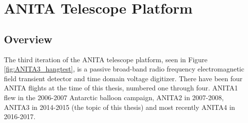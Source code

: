 
\chapter{ANITA Telescope Platform}
\section{Overview}
	The third iteration of the ANITA telescope platform, seen in Figure \ref{fig:ANITA3_hangtest}, is a passive broad-band radio frequency electromagnetic field transient detector and time domain voltage digitizer.  There have been four ANITA flights at the time of this thesis, numbered one through four.  ANITA1 flew in the 2006-2007 Antarctic balloon campaign\cite{ANITA1}, ANITA2 in 2007-2008\cite{ANITA2}, ANITA3 in 2014-2015 (the topic of this thesis) and most recently ANITA4 in 2016-2017.
	
